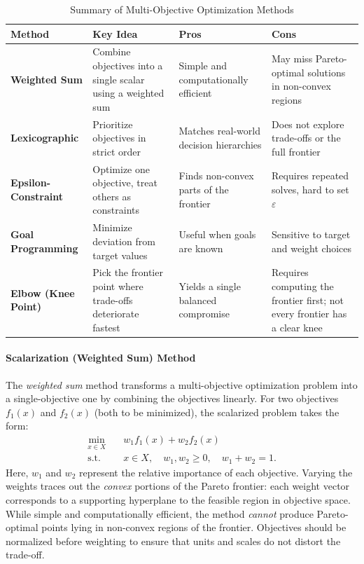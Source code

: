 \begin{table}[h]
\centering
\caption{Summary of Multi-Objective Optimization Methods}
\label{tab:moo-methods}
\renewcommand{\arraystretch}{1.3}
\begin{tabular}{|l|p{4.2cm}|p{3.5cm}|p{3.5cm}|}
\hline
\textbf{Method} & \textbf{Key Idea} & \textbf{Pros} & \textbf{Cons} \\
\hline
\textbf{Weighted Sum} & Combine objectives into a single scalar using a weighted sum & Simple and computationally efficient & May miss Pareto-optimal solutions in non-convex regions \\
\hline
\textbf{Lexicographic} & Prioritize objectives in strict order & Matches real-world decision hierarchies & Does not explore trade-offs or the full frontier \\
\hline
\textbf{Epsilon-Constraint} & Optimize one objective, treat others as constraints & Finds non-convex parts of the frontier & Requires repeated solves, hard to set $\varepsilon$ \\
\hline
\textbf{Goal Programming} & Minimize deviation from target values & Useful when goals are known & Sensitive to target and weight choices \\
\hline
\textbf{Elbow (Knee Point)} & Pick the frontier point where trade-offs deteriorate fastest & Yields a single balanced compromise & Requires computing the frontier first; not every frontier has a clear knee \\
\hline
\end{tabular}
\end{table}

\paragraph{Scalarization (Weighted Sum) Method}
The \emph{weighted sum} method transforms a multi-objective optimization problem into a single-objective one by combining the objectives linearly.
For two objectives $f_1(x)$ and $f_2(x)$ (both to be minimized), the scalarized problem takes the form:
\begin{align*}
\min_{x \in X} \quad & w_1 f_1(x) + w_2 f_2(x) \\
\text{s.t.} \quad & x \in X, \quad w_1, w_2 \ge 0, \quad w_1 + w_2 = 1.
\end{align*}
Here, $w_1$ and $w_2$ represent the relative importance of each objective. Varying the weights traces out the \emph{convex} portions of the Pareto frontier: each weight vector corresponds to a supporting hyperplane to the feasible region in objective space.
While simple and computationally efficient, the method \emph{cannot} produce Pareto-optimal points lying in non-convex regions of the frontier. Objectives should be normalized before weighting to ensure that units and scales do not distort the trade-off.

